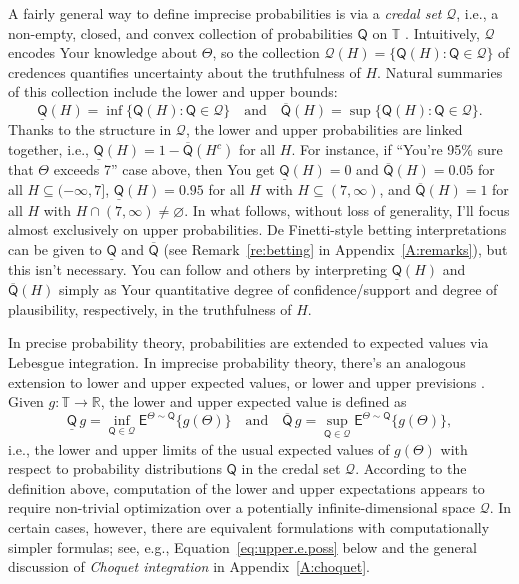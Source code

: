 \documentclass[a4paper, 12pt]{article}
\theoremstyle{plain}
\theoremstyle{definition}
\theoremstyle{remark}
\newcommand{\E}{\mathsf{E}}
\newcommand{\RR}{\mathbb{R}}
\newcommand{\TT}{\mathbb{T}}
\newcommand{\prior}{\mathsf{Q}}
\newcommand{\credal}{\mathscr{Q}}
\newcommand{\lprior}{\underline{\mathsf{Q}}}
\newcommand{\uprior}{\overline{\mathsf{Q}}}
\begin{document}
A fairly general way to define imprecise probabilities is via a {\em credal set} $\credal$, i.e., a non-empty, closed, and convex collection of probabilities $\prior$ on $\TT$ \citep[e.g.,][Sec.~4.2]{levi1980}.  Intuitively, $\credal$ encodes Your knowledge about $\Theta$, so the collection $\credal(H) = \{ \prior(H): \prior \in \credal \}$ of credences quantifies uncertainty about the truthfulness of $H$.  Natural summaries of this collection include the lower and upper bounds:
\begin{equation}
\label{eq:lower.upper}
\lprior(H) = \inf\{ \prior(H): \prior \in \credal \} \quad \text{and} \quad \uprior(H) = \sup\{ \prior(H): \prior \in \credal \}. 
\end{equation}
Thanks to the structure in $\credal$, the lower and upper probabilities are linked together, 
i.e., $\lprior(H) = 1 - \uprior(H^c)$ for all $H$.  For instance, if ``You're 95\% sure that $\Theta$ exceeds 7'' case above, then You get $\lprior(H)=0$ and $\uprior(H) = 0.05$ for all $H \subseteq (-\infty, 7]$, $\lprior(H)=0.95$ for all $H$ with $H \subseteq (7,\infty)$, and $\uprior(H) = 1$ for all $H$ with $H \cap (7,\infty) \neq \varnothing$.  In what follows, without loss of generality, I'll focus almost exclusively on upper probabilities.  De Finetti-style betting interpretations can be given to $\lprior$ and $\uprior$ (see  Remark~\ref{re:betting} in Appendix~\ref{A:remarks}), but this isn't necessary.  You can follow \citet{shafer1976} and others by interpreting $\lprior(H)$ and $\uprior(H)$ simply as Your quantitative degree of confidence/support and degree of plausibility, respectively, in the truthfulness of $H$. 


In precise probability theory, probabilities are extended to expected values via Lebesgue integration.  In imprecise probability theory, there's an analogous extension to lower and upper expected values, or lower and upper previsions \citep[e.g.,][]{walley1991, lower.previsions.book}.  Given $g: \TT \to \RR$, the lower and upper expected value is defined as 
\begin{equation}
\label{eq:envelope}
\lprior \, g = \inf_{\prior \in \credal} \E^{\Theta \sim \prior} \{g(\Theta)\} \quad \text{and} \quad \uprior \, g = \sup_{\prior \in \credal} \E^{\Theta \sim \prior} \{ g(\Theta) \}, 
\end{equation}
i.e., the lower and upper limits of the usual expected values of $g(\Theta)$ with respect to probability distributions $\prior$ in the credal set $\credal$.  
According to the definition above, computation of the lower and upper expectations appears to require non-trivial optimization over a potentially infinite-dimensional space $\credal$.  In certain cases, however, there are equivalent formulations with computationally simpler formulas; see, e.g., Equation~\eqref{eq:upper.e.poss} below and the general discussion of {\em Choquet integration} in Appendix~\ref{A:choquet}.   
\end{document}
